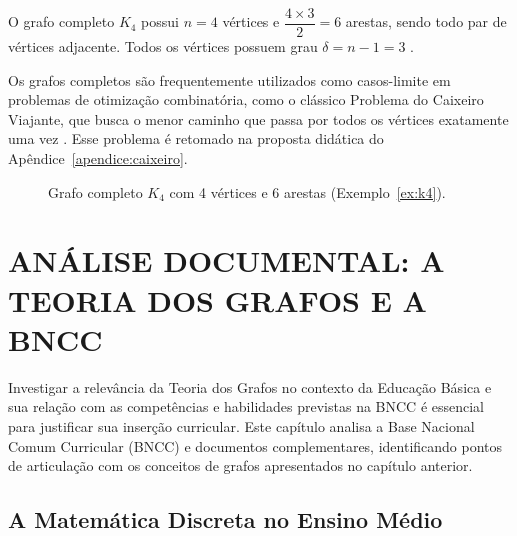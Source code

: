 \documentclass[
  12pt,
  oneside,
  a4paper,
  english,
  brazilian
  ]{abntex2}
\theoremstyle{definition}
\def\sffamily{}%
\def\bfseries{}%
\begin{document}
\label{ex:k4}
O grafo completo $K_4$ possui $n = 4$ vértices e
$\dfrac{4 \times 3}{2} = 6$ arestas, sendo todo par de vértices adjacente.
Todos os vértices possuem grau $\delta = n - 1 = 3$ \cite{bondy1976}.

Os grafos completos são frequentemente utilizados como casos-limite em problemas
de otimização combinatória, como o clássico Problema do Caixeiro Viajante, que
busca o menor caminho que passa por todos os vértices exatamente uma vez
\cite{rosen2012}. Esse problema é retomado na proposta didática do Apêndice~\ref{apendice:caixeiro}.


\begin{figure}[!t]
  \centering
  \caption{Grafo completo $K_4$ com 4 vértices e 6 arestas
           (Exemplo~\ref{ex:k4}).}
  \label{fig:k4}
\end{figure}
\vfill

\chapter{ANÁLISE DOCUMENTAL: A TEORIA DOS GRAFOS E A BNCC}
\label{cap:bncc}

Investigar a relevância da Teoria dos Grafos no contexto da Educação Básica e
sua relação com as competências e habilidades previstas na BNCC é essencial para
justificar sua inserção curricular. Este capítulo analisa a Base Nacional Comum
Curricular (BNCC) e documentos complementares, identificando pontos de
articulação com os conceitos de grafos apresentados no capítulo anterior.

\section{A Matemática Discreta no Ensino Médio}
\end{document}
